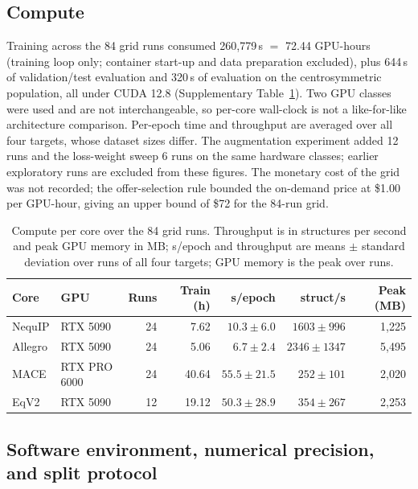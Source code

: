 \subsection*{Compute}

Training across the 84 grid runs consumed 260,779\,s $=$ 72.44 GPU-hours (training loop only; container start-up and data preparation excluded), plus 644\,s of validation/test evaluation and 320\,s of evaluation on the centrosymmetric population, all under CUDA 12.8 (Supplementary Table~\ref{stab:compute}). Two GPU classes were used and are not interchangeable, so per-core wall-clock is not a like-for-like architecture comparison. Per-epoch time and throughput are averaged over all four targets, whose dataset sizes differ. The augmentation experiment added 12 runs and the loss-weight sweep 6 runs on the same hardware classes; earlier exploratory runs are excluded from these figures. The monetary cost of the grid was not recorded; the offer-selection rule bounded the on-demand price at \$1.00 per GPU-hour, giving an upper bound of \$72 for the 84-run grid.

\begin{table}[htbp]
\centering
\caption{Compute per core over the 84 grid runs. Throughput is in structures per second and peak GPU memory in MB; s/epoch and throughput are means $\pm$ standard deviation over runs of all four targets; GPU memory is the peak over runs.}
\label{stab:compute}
\fontsize{7bp}{8.5bp}\selectfont
\begin{tabular*}{\textwidth}{@{\extracolsep{\fill}}llrrrrr}
\toprule
Core & GPU & Runs & Train (h) & s/epoch & struct/s & Peak (MB) \\
\midrule
NequIP & RTX 5090 & 24 & 7.62 & $10.3 \pm 6.0$ & $1603 \pm 996$ & 1{,}225 \\
Allegro & RTX 5090 & 24 & 5.06 & $6.7 \pm 2.4$ & $2346 \pm 1347$ & 5{,}495 \\
MACE & RTX PRO 6000 & 24 & 40.64 & $55.5 \pm 21.5$ & $252 \pm 101$ & 2{,}020 \\
EqV2 & RTX 5090 & 12 & 19.12 & $50.3 \pm 28.9$ & $354 \pm 267$ & 2{,}253 \\
\bottomrule
\end{tabular*}
\end{table}

\subsection*{Software environment, numerical precision, and split protocol}

